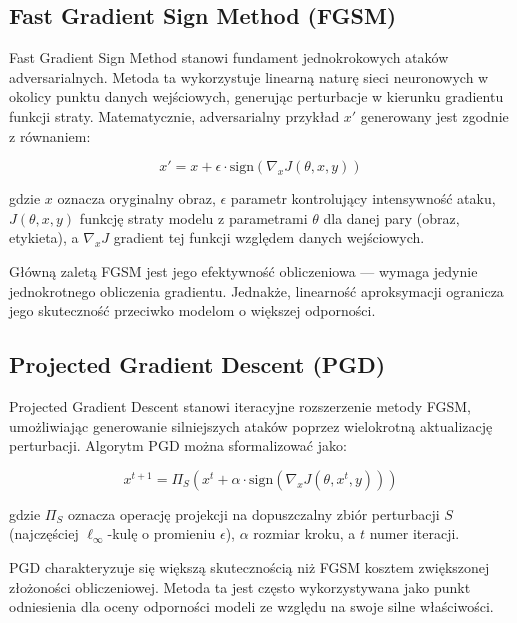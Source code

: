 \documentclass[12pt]{article}
\begin{document}
\subsection{Fast Gradient Sign Method (FGSM)}

Fast Gradient Sign Method \cite{goodfellow2014explaining} stanowi fundament jednokrokowych ataków adversarialnych. Metoda ta wykorzystuje linearną naturę sieci neuronowych w okolicy punktu danych wejściowych, generując perturbacje w kierunku gradientu funkcji straty. Matematycznie, adversarialny przykład $x'$ generowany jest zgodnie z równaniem:

\begin{equation}
    x' = x + \epsilon \cdot \text{sign}(\nabla_x J(\theta, x, y))
\end{equation}

gdzie $x$ oznacza oryginalny obraz, $\epsilon$ parametr kontrolujący intensywność ataku, $J(\theta, x, y)$ funkcję straty modelu z parametrami $\theta$ dla danej pary (obraz, etykieta), a $\nabla_x J$ gradient tej funkcji względem danych wejściowych.

Główną zaletą FGSM jest jego efektywność obliczeniowa --- wymaga jedynie jednokrotnego obliczenia gradientu. Jednakże, linearność aproksymacji ogranicza jego skuteczność przeciwko modelom o większej odporności.

\subsection{Projected Gradient Descent (PGD)}

Projected Gradient Descent \cite{madry2017towards} stanowi iteracyjne rozszerzenie metody FGSM, umożliwiając generowanie silniejszych ataków poprzez wielokrotną aktualizację perturbacji. Algorytm PGD można sformalizować jako:

\begin{equation}
    x^{t+1} = \Pi_{S}(x^t + \alpha \cdot \text{sign}(\nabla_x J(\theta, x^t, y)))
\end{equation}

gdzie $\Pi_{S}$ oznacza operację projekcji na dopuszczalny zbiór perturbacji $S$ (najczęściej $\ell_\infty$-kulę o promieniu $\epsilon$), $\alpha$ rozmiar kroku, a $t$ numer iteracji.

PGD charakteryzuje się większą skutecznością niż FGSM kosztem zwiększonej złożoności obliczeniowej. Metoda ta jest często wykorzystywana jako punkt odniesienia dla oceny odporności modeli ze względu na swoje silne właściwości.
\end{document}
